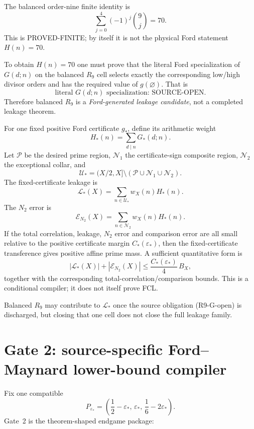 \documentclass[11pt]{article}
\theoremstyle{definition}
\newcommand{\1}{\mathbf 1}
\newcommand{\status}[1]{\textsf{#1}}
\begin{document}
The balanced order-nine finite identity is
\[
\boxed{
\sum_{j=0}^{4}(-1)^j\binom9j=70.
}
\tag{R9-70}
\]
This is \status{PROVED-FINITE}; by itself it is not the physical Ford statement
$H(n)=70$.

To obtain $H(n)=70$ one must prove that the literal Ford specialization of $G(d;n)$ on the
balanced $R_9$ cell selects exactly the corresponding low/high divisor orders and has the
required value of $g(\varnothing)$.  That is
\[
\boxed{\text{literal }G(d;n)\text{ specialization: SOURCE-OPEN}.}
\tag{R9-G-open}
\]
Therefore balanced $R_9$ is a \emph{Ford-generated leakage candidate}, not a completed
leakage theorem.

For one fixed positive Ford certificate $g_\ast$, define its arithmetic weight
\[
H_\ast(n)=\sum_{d\mid n}G_\ast(d;n).
\]
Let $\mathcal P$ be the desired prime region, $\mathcal N_1$ the certificate-sign composite
region, $\mathcal N_2$ the exceptional collar, and
\[
\mathcal U_\ast
=
(X/2,X]\setminus(\mathcal P\cup\mathcal N_1\cup\mathcal N_2).
\]
The fixed-certificate leakage is
\[
\boxed{
\mathcal L_\ast(X)
=
\sum_{n\in\mathcal U_\ast}w_X(n)H_\ast(n).
}
\tag{FCL}
\]
The $N_2$ error is
\[
\mathcal E_{N_2}(X)
=
\sum_{n\in\mathcal N_2}w_X(n)H_\ast(n).
\]
If the total correlation, leakage, $N_2$ error and comparison error are all small relative
to the positive certificate margin $C_\ast(\varepsilon_\ast)$, then the fixed-certificate
transference gives positive affine prime mass.  A sufficient quantitative form is
\[
|\mathcal L_\ast(X)|+|\mathcal E_{N_2}(X)|
\le
\frac{C_\ast(\varepsilon_\ast)}4\,B_X,
\tag{FCL-margin}
\]
together with the corresponding total-correlation/comparison bounds.
This is a conditional compiler; it does not itself prove FCL.

Balanced $R_9$ may contribute to $\mathcal L_\ast$ once the source obligation (R9-G-open) is discharged,
but closing that one cell does not close the full leakage family.

\section{Gate 2: source-specific Ford--Maynard lower-bound compiler}
\label{sec:gate2-theory}

Fix one compatible
\[
P_{\varepsilon_\ast}
=
\left(
\frac12-\varepsilon_\ast,\,
\varepsilon_\ast,\,
\frac16-2\varepsilon_\ast
\right).
\]
Gate~2 is the theorem-shaped endgame package:
\end{document}
